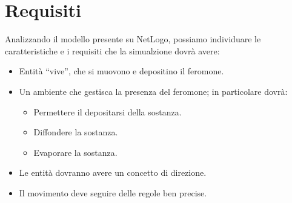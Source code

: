 \section{Requisiti} %
Analizzando il modello presente su NetLogo\cite{wilensky1997netlogo}, possiamo individuare 
le caratteristiche e i requisiti che la simualzione dovrà avere:
\begin{itemize}
    \item Entità ``vive'', che si muovono e depositino il feromone.
    \item Un ambiente che gestisca la presenza del feromone; in particolare dovrà:
    \begin{itemize}
        \item Permettere il depositarsi della sostanza.
        \item Diffondere la sostanza.
        \item Evaporare la sostanza.
    \end{itemize}
    \item Le entità dovranno avere un concetto di direzione.
    \item Il movimento deve seguire delle regole ben precise.
\end{itemize}